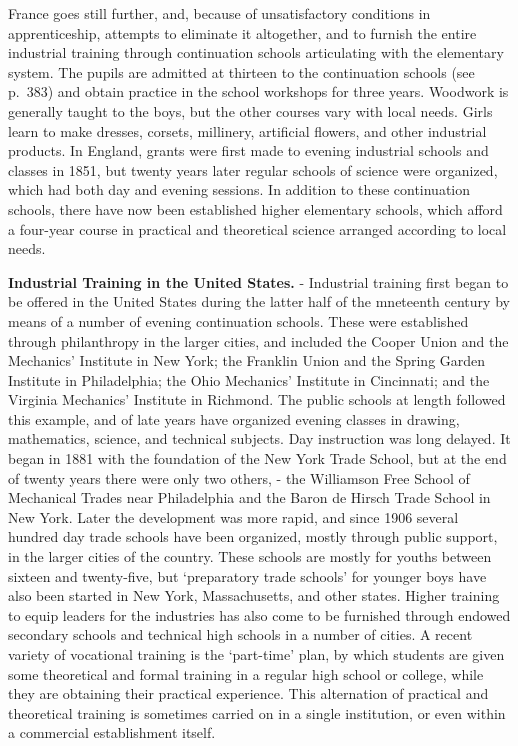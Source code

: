\documentclass[]{book}
\begin{document}
France goes still further, and, because of unsatisfactory conditions in apprenticeship, attempts to eliminate it altogether, and to furnish the entire industrial training through continuation schools articulating with the elementary system. The pupils are admitted at thirteen to the continuation schools (see p.~383) and obtain practice in the school workshops for three years. Woodwork is generally taught to the boys, but the other courses vary with local needs. Girls learn to make dresses, corsets, millinery, artificial flowers, and other industrial products. In England, grants were first made to evening industrial schools and classes in 1851, but twenty years later regular schools of science were organized, which had both day and evening sessions. In addition to these continuation schools, there have now been established higher elementary schools, which afford a four-year course in practical and theoretical science arranged according to local needs.

\textbf{Industrial Training in the United States.} - Industrial training first began to be offered in the United States during the latter half of the mneteenth century by means of a number of evening continuation schools. These were established through philanthropy in the larger cities, and included the Cooper Union and the Mechanics' Institute in New York; the Franklin Union and the Spring Garden Institute in Philadelphia; the Ohio Mechanics' Institute in Cincinnati; and the Virginia Mechanics' Institute in Richmond. The public schools at length followed this example, and of late years have organized evening classes in drawing, mathematics, science, and technical subjects. Day instruction was long delayed. It began in 1881 with the foundation of the New York Trade School, but at the end of twenty years there were only two others, - the Williamson Free School of Mechanical Trades near Philadelphia and the Baron de Hirsch Trade School in New York. Later the development was more rapid, and since 1906 several hundred day trade schools have been organized, mostly through public support, in the larger cities of the country. These schools are mostly for youths between sixteen and twenty-five, but `preparatory trade schools' for younger boys have also been started in New York, Massachusetts, and other states. Higher training to equip leaders for the industries has also come to be furnished through endowed secondary schools and technical high schools in a number of cities. A recent variety of vocational training is the `part-time' plan, by which students are given some theoretical and formal training in a regular high school or college, while they are obtaining their practical experience. This alternation of practical and theoretical training is sometimes carried on in a single institution, or even within a commercial establishment itself.
\end{document}
